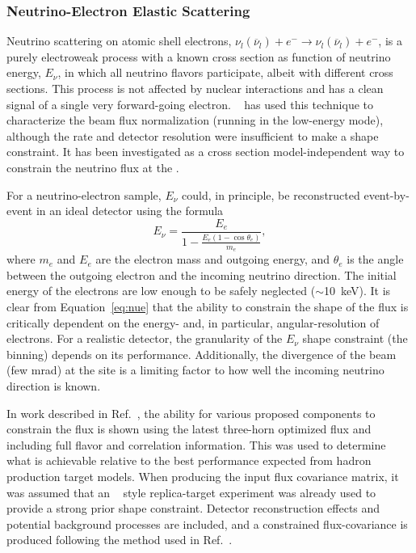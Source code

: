\subsubsection{Neutrino-Electron Elastic Scattering}
\label{sec:appx-nd:lartpc-nu-electron-scatt}

Neutrino scattering on atomic shell electrons, $\nu_{l}(\overline{\nu}_{l}) + e^{-} \rightarrow \nu_{l}(\overline{\nu}_{l}) + e^{-}$,
is a purely electroweak process with a known cross section as function of neutrino energy, $E_{\nu}$, in which all neutrino flavors participate, albeit with different cross sections. This process is not affected by nuclear interactions and has a clean signal of a single very forward-going electron. ~\cite{Park:2015eqa} has used this technique to characterize the  beam flux normalization (running in the  low-energy mode), although the rate and detector resolution were insufficient to make a shape constraint. It has been investigated as a cross section model-independent way to constrain the neutrino flux at the   .

For a neutrino-electron  sample, $E_{\nu}$ could, in principle, be reconstructed event-by-event in an ideal detector using the formula
\begin{equation}
  E_{\nu} = \frac{E_{e}}{1 - \frac{E_{e}(1-\cos\theta_{e})}{m_{e}}},
\label{eq:nue}
\end{equation}
\noindent where $m_e$ and $E_e$ are the electron mass and outgoing energy, and $\theta_e$ is the angle between the outgoing electron and the incoming neutrino direction. The initial energy of the electrons are low enough to be safely neglected ($\sim$\SI{10}{keV}). It is clear from Equation~\ref{eq:nue} that the ability to constrain the shape of the flux is critically dependent on the energy- and, in particular, angular-resolution of electrons. For a realistic detector, the granularity of the $E_{\nu}$ shape constraint (the binning) depends on its performance. Additionally, the divergence of the beam (few \si{mrad}) at the    site is a limiting factor to how well the incoming neutrino direction is known.

In work described in Ref.~\cite{PhysRevD.101.032002}, the ability for various proposed   components to constrain the  flux is shown using the latest three-horn optimized flux and including full flavor and correlation information.  This was used to determine what is achievable relative to the best performance expected from hadron production target models. When producing the input flux covariance matrix, it was assumed that an ~\cite{Laszlo:2009vg} style replica-target experiment was already used to provide a strong prior shape constraint. Detector reconstruction effects and potential background processes are included, and a constrained flux-covariance is produced following the method used in Ref.~\cite{Park:2015eqa}.

